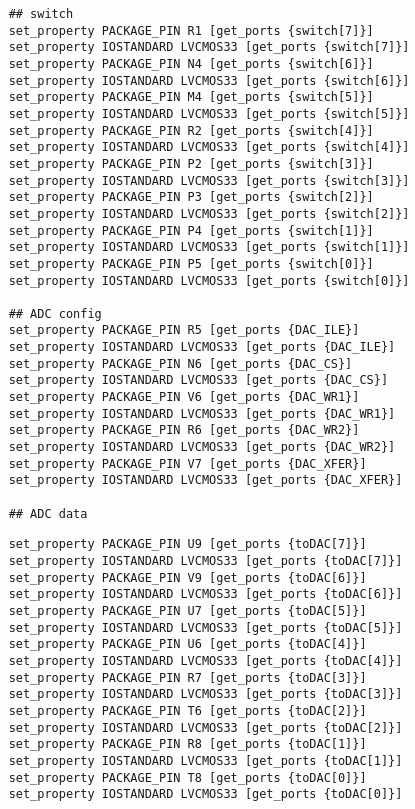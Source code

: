 {\begin{spacing}{1.5}
\begin{lstlisting}
	## switch
	set_property PACKAGE_PIN R1 [get_ports {switch[7]}]
	set_property IOSTANDARD LVCMOS33 [get_ports {switch[7]}]
	set_property PACKAGE_PIN N4 [get_ports {switch[6]}]
	set_property IOSTANDARD LVCMOS33 [get_ports {switch[6]}]
	set_property PACKAGE_PIN M4 [get_ports {switch[5]}]
	set_property IOSTANDARD LVCMOS33 [get_ports {switch[5]}]
	set_property PACKAGE_PIN R2 [get_ports {switch[4]}]
	set_property IOSTANDARD LVCMOS33 [get_ports {switch[4]}]
	set_property PACKAGE_PIN P2 [get_ports {switch[3]}]
	set_property IOSTANDARD LVCMOS33 [get_ports {switch[3]}]
	set_property PACKAGE_PIN P3 [get_ports {switch[2]}]
	set_property IOSTANDARD LVCMOS33 [get_ports {switch[2]}]
	set_property PACKAGE_PIN P4 [get_ports {switch[1]}]
	set_property IOSTANDARD LVCMOS33 [get_ports {switch[1]}]
	set_property PACKAGE_PIN P5 [get_ports {switch[0]}]
	set_property IOSTANDARD LVCMOS33 [get_ports {switch[0]}]
	
	## ADC config
	set_property PACKAGE_PIN R5 [get_ports {DAC_ILE}]
	set_property IOSTANDARD LVCMOS33 [get_ports {DAC_ILE}]
	set_property PACKAGE_PIN N6 [get_ports {DAC_CS}]
	set_property IOSTANDARD LVCMOS33 [get_ports {DAC_CS}]
	set_property PACKAGE_PIN V6 [get_ports {DAC_WR1}]
	set_property IOSTANDARD LVCMOS33 [get_ports {DAC_WR1}]
	set_property PACKAGE_PIN R6 [get_ports {DAC_WR2}]
	set_property IOSTANDARD LVCMOS33 [get_ports {DAC_WR2}]
	set_property PACKAGE_PIN V7 [get_ports {DAC_XFER}]
	set_property IOSTANDARD LVCMOS33 [get_ports {DAC_XFER}]
	
	## ADC data
	\end{lstlisting}
	\begin{lstlisting}
	set_property PACKAGE_PIN U9 [get_ports {toDAC[7]}]
	set_property IOSTANDARD LVCMOS33 [get_ports {toDAC[7]}]
	set_property PACKAGE_PIN V9 [get_ports {toDAC[6]}]
	set_property IOSTANDARD LVCMOS33 [get_ports {toDAC[6]}]
	set_property PACKAGE_PIN U7 [get_ports {toDAC[5]}]
	set_property IOSTANDARD LVCMOS33 [get_ports {toDAC[5]}]
	set_property PACKAGE_PIN U6 [get_ports {toDAC[4]}]
	set_property IOSTANDARD LVCMOS33 [get_ports {toDAC[4]}]
	set_property PACKAGE_PIN R7 [get_ports {toDAC[3]}]
	set_property IOSTANDARD LVCMOS33 [get_ports {toDAC[3]}]
	set_property PACKAGE_PIN T6 [get_ports {toDAC[2]}]
	set_property IOSTANDARD LVCMOS33 [get_ports {toDAC[2]}]
	set_property PACKAGE_PIN R8 [get_ports {toDAC[1]}]
	set_property IOSTANDARD LVCMOS33 [get_ports {toDAC[1]}]
	set_property PACKAGE_PIN T8 [get_ports {toDAC[0]}]
	set_property IOSTANDARD LVCMOS33 [get_ports {toDAC[0]}]
	

\end{lstlisting}
\end{spacing}}
